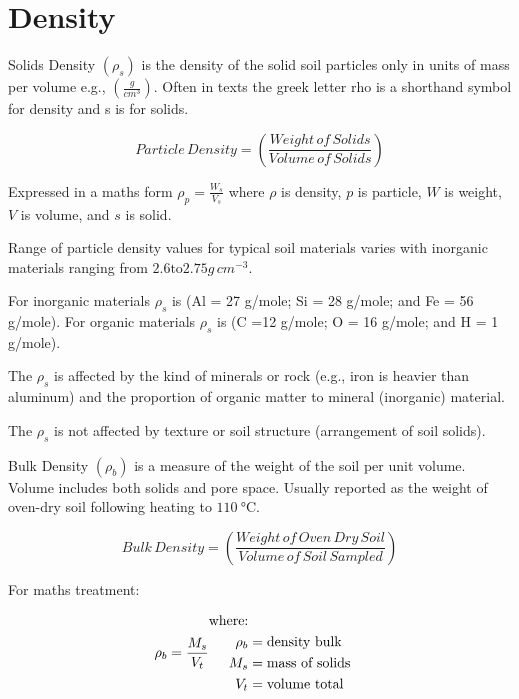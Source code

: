 \documentclass[a5paper]{book}
\begin{document}
\section{Density}
    
Solids Density $\left(\rho_s\right)$ is the density of the solid soil particles only in units of mass per volume e.g., $\left(\frac{g}{cm^3}\right)$. Often in texts the greek letter rho  is a shorthand symbol for density and s is for solids.

\begin{equation}
    Particle\,Density = \left(\frac{Weight\,of\,Solids}{Volume\,of\,Solids}\right)   
\end{equation}

Expressed in a maths form $\rho_p =\frac{W_s}{V_s}$ where $\rho$ is density, $p$ is particle, $W$ is weight, $V$ is volume, and $s$ is solid.

Range of particle density values for typical soil materials varies with inorganic materials ranging from $2.6 \text{to} 2.75 g\,cm^{-3}$.

For inorganic materials $\rho_s$ is  (Al = 27 g/mole; Si = 28 g/mole; and Fe = 56 g/mole). For organic materials $\rho_s$ is  (C =12 g/mole; O = 16 g/mole; and H = 1 g/mole).

The $\rho_s$ is affected by the kind of minerals or rock (e.g., iron is heavier than aluminum) and the proportion of organic matter to mineral (inorganic) material.

The $\rho_s$ is not affected by texture or soil structure (arrangement of soil solids).

Bulk Density $\left(\rho_b\right)$ is a measure of the weight of the soil per unit volume. Volume includes both solids and pore space. Usually reported as the weight of oven-dry soil following heating to $\SI{110}{\degreeCelsius}$.

\begin{equation}
    Bulk\,Density = \left(\frac{Weight\,of\,Oven\,Dry\,Soil}{Volume\,of\,Soil\,Sampled}\right)
\end{equation}

For maths treatment:

\begin{equation}
    \rho_b = \frac{M_s}{V_t}\quad\\
    \begin{aligned}
    \text{where:}\\
        \rho_b &= \text{density bulk} \\
        M_s &= \text{mass of solids} \\
        V_t &= \text{volume total} \\
    \end{aligned}
\end{equation}
\end{document}
